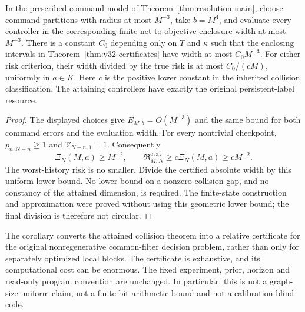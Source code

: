 \begin{corollary}
\label{cor:v32-relative}
In the prescribed-command model of Theorem~\ref{thm:resolution-main},
choose command partitions with radius at most $M^{-3}$, take
$b=M^4$, and evaluate every controller in the corresponding finite net
to objective-enclosure width at most $M^{-3}$. There is a constant $C_0$
depending only on $T$ and $\kappa$ such that the enclosing intervals
in Theorem~\ref{thm:v32-certificates} have width at most $C_0M^{-3}$.
For either risk criterion, their width divided by the true risk is at
most $C_0/(cM)$, uniformly in $a\in K$. Here $c$ is the positive lower
constant in the inherited collision classification. The attaining
controllers have exactly the original persistent-label resource.
\end{corollary}
\begin{proof}
The displayed choices give $E_{M,b}=O(M^{-3})$ and the same bound for
both command errors and the evaluation width. For every nontrivial
checkpoint, $p_{n,N-n}\ge1$ and $\mathcal V_{N-n,1}=1$. Consequently
\[
 \Xi_N(M,a)\ge M^{-2},\qquad
 \mathfrak R_{M,N}^{a,\mathrm{av}}
       \ge c\Xi_N(M,a)\ge cM^{-2}.
\]
The worst-history risk is no smaller. Divide the certified absolute
width by this uniform lower bound. No lower bound on a nonzero collision
gap, and no constancy of the attained dimension, is required. The
finite-state construction and approximation were proved without using
this geometric lower bound; the final division is therefore not circular.
\end{proof}

The corollary converts the attained collision theorem into a relative
certificate for the original nonregenerative common-filter decision
problem, rather than only for separately optimized local blocks. The
certificate is exhaustive, and its computational cost can be enormous.
The fixed experiment, prior, horizon and read-only program convention
are unchanged. In particular, this is not a graph-size-uniform claim,
not a finite-bit arithmetic bound and not a calibration-blind code.

